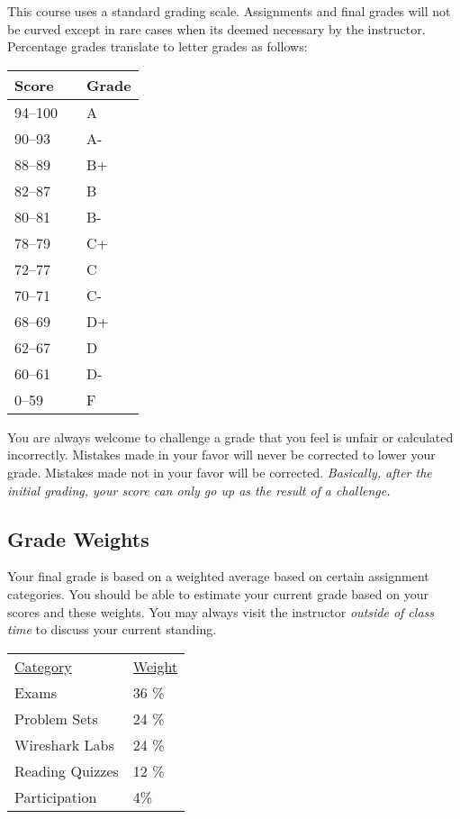 \documentclass[10pt]{article}
\begin{document}
This course uses a standard grading scale.  Assignments and final grades will not be curved except in rare cases when its deemed necessary by the instructor.  Percentage grades translate to letter grades as follows:

\begin{center}
\begin{small}
\begin{tabular}{lcl}
Score & & Grade \\ \toprule
94--100 & & A \\
90--93 & & A- \\
88--89 & & B+ \\
82--87 & & B \\
80--81 & & B- \\
78--79 & & C+ \\
72--77 & & C \\
70--71 & & C- \\
68--69 & & D+ \\
62--67 & & D \\
60--61 & & D- \\
0--59 & & F
\end{tabular}
\end{small}
\end{center}


You are always welcome to challenge a grade that you feel is unfair or calculated incorrectly.  Mistakes made in your favor will never be corrected to lower your grade.  Mistakes made not in your favor will be corrected.  \textit{Basically, after the initial grading, your score can only go up as the result of a challenge.}

\subsection{Grade Weights}

Your final grade is based on a weighted average based on certain  assignment categories.  You should be able to estimate your current grade based on your scores and these weights.  You may always visit the instructor \textit{outside of class time} to discuss your current standing.

\begin{center}
  \begin{tabular}{ll}
  \underline{Category} & \underline{Weight} \\
    Exams & 36 \% \\ %
    Problem Sets &  24 \% \\ %
    Wireshark Labs & 24 \% \\ %
    Reading Quizzes & 12 \% \\ %
    Participation & 4\%
  \end{tabular}
\end{center}
\end{document}
